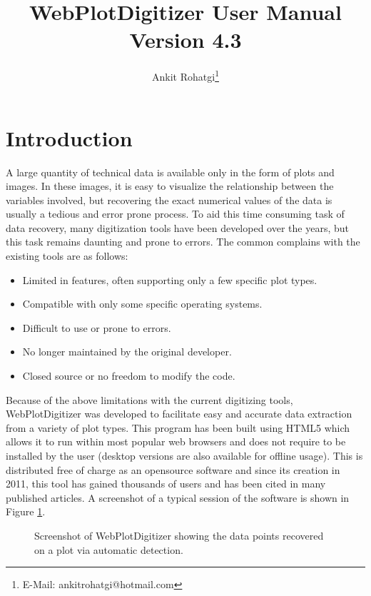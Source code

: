 \documentclass[letterpaper, 11pt]{article}
\begin{document}
\title{WebPlotDigitizer User Manual\\ Version 4.3}
\author{Ankit Rohatgi\footnote{E-Mail: ankitrohatgi@hotmail.com}}
\maketitle
\tableofcontents
\newpage
\section{Introduction}
A large quantity of technical data is available only in the form of plots and images. In these images, it is easy to visualize the relationship between the variables involved, but recovering the exact numerical values of the data is usually a tedious and error prone process. To aid this time consuming task of data recovery, many digitization tools have been developed over the years, but this task remains daunting and prone to errors. The common complains with the existing tools are as follows:

\begin{itemize}
\item{Limited in features, often supporting only a few specific plot types.}
\item{Compatible with only some specific operating systems.}
\item{Difficult to use or prone to errors.}
\item{No longer maintained by the original developer.}
\item{Closed source or no freedom to modify the code.}
\end{itemize}

Because of the above limitations with the current digitizing tools, WebPlotDigitizer was developed to facilitate easy and accurate data extraction from a variety of plot types. This program has been built using HTML5 which allows it to run within most popular web browsers and does not require to be installed by the user (desktop versions are also available for offline usage). This is distributed free of charge as an opensource software and since its creation in 2011, this tool has gained thousands of users and has been cited in many published articles. A screenshot of a typical session of the software is shown in Figure \ref{fig:screenshot}.

\begin{figure}
\begin{center}
\caption{Screenshot of WebPlotDigitizer showing the data points recovered on a plot via automatic detection.}
\label{fig:screenshot}
\end{center}
\end{figure}
\end{document}
